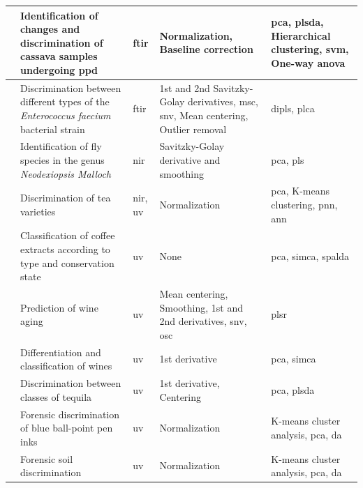 \begin{scriptsize}
\begin{longtable}{|m{1.5cm}|m{3cm}|m{1.5cm}|m{4cm}|m{4cm}|}
		\hline 
		\cite{uarrota2014metabolomics} & Identification of changes and discrimination of cassava samples undergoing \gls{ppd} & \gls{ftir} & Normalization, Baseline correction & \gls{pca}, \gls{plsda}, Hierarchical clustering, \gls{svm}, One-way \gls{anova} \\ 
		
		\hline 
		\cite{preisner2007fourier} & Discrimination between different types of the \textit{Enterococcus faecium} bacterial strain & \gls{ftir} & 1st
		and 2nd Savitzky-Golay derivatives, \gls{msc}, \gls{snv}, Mean centering, Outlier removal & \gls{dipls}, \gls{plca} \\ 
		
		\hline 
		\cite{de2011barcoding} & Identification of fly species in the genus \textit{Neodexiopsis Malloch} & \gls{nir} & Savitzky-Golay derivative and smoothing & \gls{pca}, \gls{pls} \\ 
		
		\hline 
		\cite{kumar2013discrimination} & Discrimination of tea varieties & \gls{nir}, \newline \gls{uv} & Normalization & \gls{pca}, K-means clustering, \gls{pnn}, \gls{ann} \\ 
		
		\hline 
		\cite{souto2010uv} & Classification of coffee extracts according to type and conservation state & \gls{uv} & None & \gls{pca}, \gls{simca}, \gls{spalda} \\ 
						
		\hline 
		\cite{pereira2011madeira} & Prediction of wine aging & \gls{uv} & Mean centering, Smoothing, 1st and 2nd derivatives, \gls{snv}, \gls{osc} & \gls{plsr} \\ 
		
		\hline 
		\cite{urbano2006ultraviolet} & Differentiation and classification of wines & \gls{uv} & 1st derivative & \gls{pca}, \gls{simca} \\ 
		
		\hline 
		\cite{barbosa2007uv} &  Discrimination between classes of tequila & \gls{uv} & 1st derivative, Centering & \gls{pca}, \gls{plsda} \\ 
		
		\hline 
		\cite{thanasoulias2003multivariate} & Forensic discrimination of blue ball-point pen inks & \gls{uv} & Normalization & K-means cluster analysis, \gls{pca}, \gls{da} \\ 
		
		\hline 
		\cite{thanasoulias2002application} & Forensic soil discrimination & \gls{uv} & Normalization & K-means cluster analysis, \gls{pca}, \gls{da} \\ 
		

\end{longtable}
\end{scriptsize}
